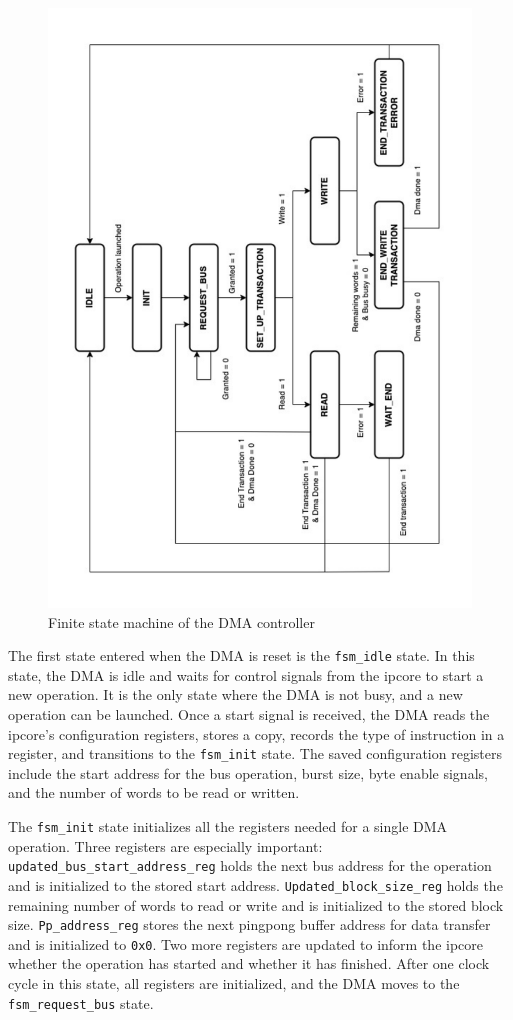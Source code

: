\documentclass[a4paper,11pt,oneside]{report}
\begin{document}
\begin{figure}
    \centering
    \includegraphics[angle=-90, width=0.9\linewidth]{figures/dma_fsm.pdf}
    \caption{Finite state machine of the DMA controller}
    \label{fig:state_diagram}
\end{figure}

The first state entered when the DMA is reset is the \texttt{fsm\_idle} state.  
In this state, the DMA is idle and waits for control signals from the ipcore to start a new operation.  
It is the only state where the DMA is not busy, and a new operation can be launched.  
Once a start signal is received, the DMA reads the ipcore's configuration registers, stores a copy,  
records the type of instruction in a register, and transitions to the \texttt{fsm\_init} state.  
The saved configuration registers include the start address for the bus operation, burst size, byte enable signals, and the number of words to be read or written.

The \texttt{fsm\_init} state initializes all the registers needed for a single DMA operation.  
Three registers are especially important:  
\texttt{updated\_bus\_start\_address\_reg} holds the next bus address for the operation and is initialized to the stored start address.  
\texttt{Updated\_block\_size\_reg} holds the remaining number of words to read or write and is initialized to the stored block size.  
\texttt{Pp\_address\_reg} stores the next pingpong buffer address for data transfer and is initialized to \texttt{0x0}.  
Two more registers are updated to inform the ipcore whether the operation has started and whether it has finished.  
After one clock cycle in this state, all registers are initialized, and the DMA moves to the \texttt{fsm\_request\_bus} state.
\end{document}

